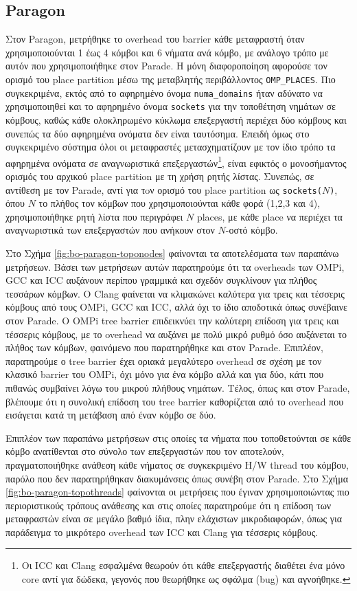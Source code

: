 \subsection{Paragon}
Στον Paragon, μετρήθηκε το overhead του barrier κάθε μεταφραστή όταν χρησιμοποιούνται 1 έως 4 κόμβοι και 6 νήματα ανά κόμβο, με ανάλογο τρόπο με αυτόν που χρησιμοποιήθηκε στον Parade. Η μόνη διαφοροποίηση αφορούσε τον ορισμό του place partition μέσω της μεταβλητής περιβάλλοντος \texttt{OMP\_PLACES}. Πιο συγκεκριμένα, εκτός από το αφηρημένο όνομα \texttt{numa\_domains} ήταν αδύνατο να χρησιμοποιηθεί και το αφηρημένο όνομα \texttt{sockets} για την τοποθέτηση νημάτων σε κόμβους, καθώς κάθε ολοκληρωμένο κύκλωμα επεξεργαστή περιέχει δύο κόμβους και συνεπώς τα δύο αφηρημένα ονόματα δεν είναι ταυτόσημα. Επειδή όμως στο συγκεκριμένο σύστημα όλοι οι μεταφραστές μετασχηματίζουν με τον ίδιο τρόπο τα αφηρημένα ονόματα σε αναγνωριστικά επεξεργαστών\footnote{Οι ICC και Clang εσφαλμένα θεωρούν ότι κάθε επεξεργαστής διαθέτει ένα μόνο core αντί για δώδεκα, γεγονός που θεωρήθηκε ως σφάλμα (bug) και αγνοήθηκε.}, είναι εφικτός ο μονοσήμαντος ορισμός του αρχικού place partition με τη χρήση ρητής λίστας. Συνεπώς, σε αντίθεση με τον Parade, αντί για τoν ορισμό του place partition ως \texttt{sockets($N$)}, όπου $N$ το πλήθος τον κόμβων που χρησιμοποιούνται κάθε φορά (1,2,3 και 4), χρησιμοποιήθηκε ρητή λίστα που περιγράφει $N$ places, με κάθε place να περιέχει τα αναγνωριστικά των επεξεργαστών που ανήκουν στον $N$-οστό κόμβο.

Στο Σχήμα \ref{fig:bo-paragon-toponodes} φαίνονται τα αποτελέσματα των παραπάνω μετρήσεων. Βάσει των μετρήσεων αυτών παρατηρούμε ότι τα overheads των OMPi, GCC και ICC αυξάνουν περίπου γραμμικά και σχεδόν συγκλίνουν για πλήθος τεσσάρων κόμβων. Ο Clang φαίνεται να κλιμακώνει καλύτερα για τρεις και τέσσερις κόμβους από τους OMPi, GCC και ICC, αλλά όχι το ίδιο αποδοτικά όπως συνέβαινε στον Parade. Ο OMPi tree barrier επιδεικνύει την καλύτερη επίδοση για τρεις και τέσσερις κόμβους, με το overhead να αυξάνει με πολύ μικρό ρυθμό όσο αυξάνεται το πλήθος των κόμβων, φαινόμενο που παρατηρήθηκε και στον Parade. Επιπλέον, παρατηρούμε ο tree barrier έχει οριακά μεγαλύτερο overhead σε σχέση με τον κλασικό barrier του OMPi, όχι μόνο για ένα κόμβο αλλά και για δύο, κάτι που πιθανώς συμβαίνει λόγω του μικρού πλήθους νημάτων. Τέλος, όπως και στον Parade, βλέπουμε ότι η συνολική επίδοση του tree barrier καθορίζεται από το overhead που εισάγεται κατά τη μετάβαση από έναν κόμβο σε δύο.

Επιπλέον των παραπάνω μετρήσεων στις οποίες τα νήματα που τοποθετούνται σε κάθε κόμβο ανατίθενται στο σύνολο των επεξεργαστών που τον αποτελούν, πραγματοποιήθηκε ανάθεση κάθε νήματος σε συγκεκριμένο H/W thread του κόμβου, παρόλο που δεν παρατηρήθηκαν διακυμάνσεις όπως συνέβη στον Parade. Στο Σχήμα \ref{fig:bo-paragon-topothreads} φαίνονται οι μετρήσεις που έγιναν χρησιμοποιώντας πιο περιοριστικούς τρόπους ανάθεσης και στις οποίες παρατηρούμε ότι η επίδοση των μεταφραστών είναι σε μεγάλο βαθμό ίδια, πλην ελάχιστων μικροδιαφορών, όπως για παράδειγμα το μικρότερο overhead των ICC και Clang για τέσσερις κόμβους.

